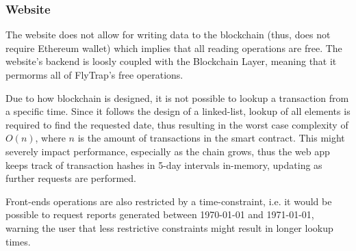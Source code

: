 \subsubsection{Website}
The website does not allow for writing data to the blockchain (thus, does not require Ethereum wallet) which implies that all reading operations are free. The website's backend is loosly coupled with the Blockchain Layer, meaning that it permorms all of FlyTrap's free operations.

Due to how blockchain is designed, it is not possible to lookup a transaction from a specific time. Since it follows the design of a linked-list, lookup of all elements is required to find the requested date, thus resulting in the worst case complexity of $O(n)$, where $n$ is the amount of transactions in the smart contract. This might severely impact performance, especially as the chain grows, thus the web app keeps track of transaction hashes in 5-day intervals in-memory, updating as further requests are performed.

Front-ends operations are also restricted by a time-constraint, i.e. it would be possible to request reports generated between 1970-01-01 and 1971-01-01, warning the user that less restrictive constraints might result in longer lookup times.
